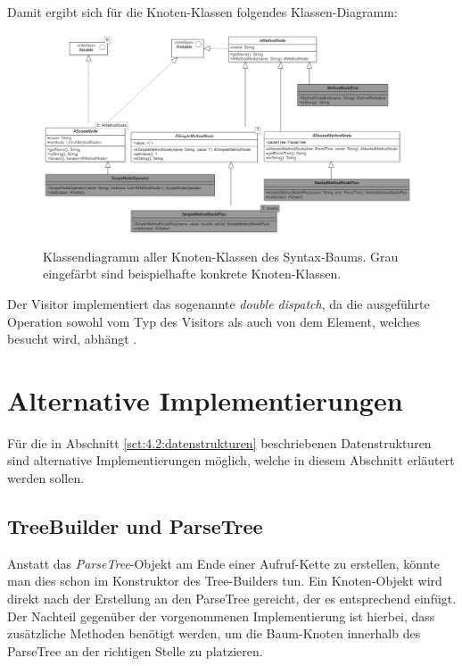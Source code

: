 Damit ergibt sich für die Knoten-Klassen folgendes Klassen-Diagramm:

\begin{figure}[H]
\centering\includegraphics[width=.9\textwidth]{images/kapitel4/classDiagram1.png}
\caption{Klassendiagramm aller Knoten-Klassen des Syntax-Baums. Grau eingefärbt sind beispielhafte konkrete Knoten-Klassen.}
\label{fig:class-diagram1}
\end{figure}

Der Visitor implementiert das sogenannte \emph{double dispatch}, da die ausgeführte Operation sowohl vom Typ des Visitors als auch von dem Element, welches besucht wird, abhängt \cite{www:visitor-sourcemaking}.

\section{Alternative Implementierungen}\label{sct:4.4:alternativen}
Für die in Abschnitt \ref{sct:4.2:datenstrukturen} beschriebenen Datenstrukturen sind alternative Implementierungen möglich, welche in diesem Abschnitt erläutert werden sollen.

\subsection{TreeBuilder und ParseTree}\label{ssct:4.4.1:alt-treebuilder-parsetree}
Anstatt das \emph{ParseTree}-Objekt am Ende einer Aufruf-Kette zu erstellen, könnte man dies schon im Konstruktor des Tree-Builders tun. Ein Knoten-Objekt wird direkt nach der Erstellung an den ParseTree gereicht, der es entsprechend einfügt. Der Nachteil gegenüber der vorgenommenen Implementierung ist hierbei, dass zusätzliche Methoden benötigt werden, um die Baum-Knoten innerhalb des ParseTree an der richtigen Stelle zu platzieren.

